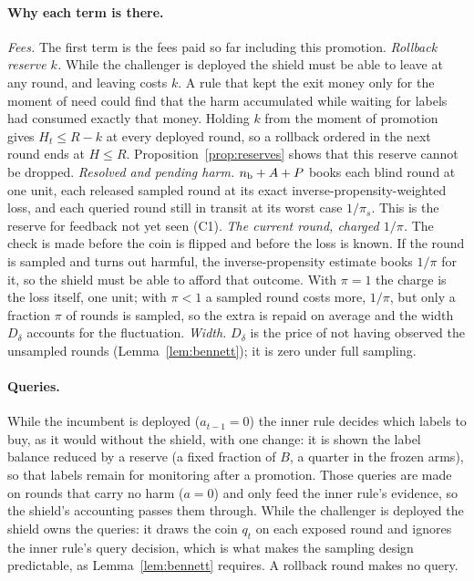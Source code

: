 \documentclass[10pt]{article}
\theoremstyle{plain}
\theoremstyle{definition}
\begin{document}
\paragraph{Why each term is there.}
\emph{Fees.} The first term is the fees paid so far including this promotion.
\emph{Rollback reserve $k$.} While the challenger is deployed the shield must be able to leave at any round, and leaving costs $k$. A rule that kept the exit money only for the moment of need could find that the harm accumulated while waiting for labels had consumed exactly that money. Holding $k$ from the moment of promotion gives $H_t\le R-k$ at every deployed round, so a rollback ordered in the next round ends at $H\le R$. Proposition~\ref{prop:reserves} shows that this reserve cannot be dropped.
\emph{Resolved and pending harm.} $n_{\rm b}+A+P$ books each blind round at one unit, each released sampled round at its exact inverse-propensity-weighted loss, and each queried round still in transit at its worst case $1/\pi_s$. This is the reserve for feedback not yet seen (C1).
\emph{The current round, charged $1/\pi$.} The check is made before the coin is flipped and before the loss is known. If the round is sampled and turns out harmful, the inverse-propensity estimate books $1/\pi$ for it, so the shield must be able to afford that outcome. With $\pi=1$ the charge is the loss itself, one unit; with $\pi<1$ a sampled round costs more, $1/\pi$, but only a fraction $\pi$ of rounds is sampled, so the extra is repaid on average and the width $D_\delta$ accounts for the fluctuation.
\emph{Width.} $D_\delta$ is the price of not having observed the unsampled rounds (Lemma~\ref{lem:bennett}); it is zero under full sampling.

\paragraph{Queries.}
While the incumbent is deployed ($a_{t-1}=0$) the inner rule decides which labels to buy, as it would without the shield, with one change: it is shown the label balance reduced by a reserve (a fixed fraction of $B$, a quarter in the frozen arms), so that labels remain for monitoring after a promotion. Those queries are made on rounds that carry no harm ($a=0$) and only feed the inner rule's evidence, so the shield's accounting passes them through. While the challenger is deployed the shield owns the queries: it draws the coin $q_t$ on each exposed round and ignores the inner rule's query decision, which is what makes the sampling design predictable, as Lemma~\ref{lem:bennett} requires. A rollback round makes no query.
\end{document}
